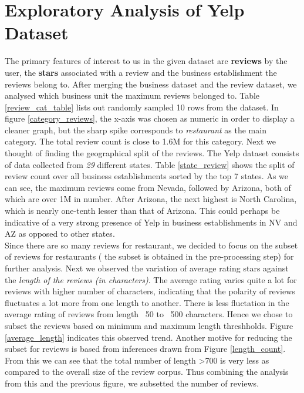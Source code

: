 \documentclass[paper=a4, fontsize=11pt]{scrartcl} %
\numberwithin{equation}{section} %
\numberwithin{figure}{section} %
\numberwithin{table}{section} %
\begin{document}
\section{Exploratory Analysis of Yelp Dataset}
The primary features of interest to us in the given dataset are \textbf{reviews} by the user, the \textbf{stars} associated with a review and the business establishment the reviews belong to. After merging the business dataset and the review dataset, we analysed which business unit the maximum reviews belonged to. Table \ref{review_cat_table} lists out randomly sampled 10 rows from the dataset. In figure \ref{category_reviews}, the x-axis was chosen as numeric in order to display a cleaner graph, but the sharp spike corresponds to \textit{restaurant} as the main category. The total review count is close to 1.6M for this category.
Next we thought of finding the geographical split of the reviews. The Yelp dataset consists of data collected from \textit{29} different states. Table \ref{state_review} shows the split of review count over all business establishments sorted by the top 7 states. 
As we can see, the maximum reviews come from Nevada, followed by Arizona, both of which are over 1M in number. After Arizona, the next highest is North Carolina, which is nearly one-tenth lesser than that of Arizona. This could perhaps be indicative of a very strong presence of Yelp in business establishments in NV and AZ as opposed to other states.\\

Since there are so many reviews for restaurant, we decided to focus on the subset of reviews for restaurants ( the subset is obtained in the pre-processing step) for further analysis.  
Next we observed the variation of average rating stars against the \textit{length of the reviews (in characters)}. The average rating varies quite a lot for reviews with higher number of characters, indicating that the polarity of reviews fluctuates a lot more from one length to another. There is less fluctation in the average rating of reviews from length ~50 to ~500 characters. Hence we chose to subset the reviews based on minimum and maximum length threshholds. Figure \ref{average_length} indicates this observed trend. Another motive for reducing the subset for reviews is based from inferences drawn from Figure \ref{length_count}. From this we can see that the total number of length >700 is very less as compared to the overall size of the review corpus. Thus combining the analysis from this and the previous figure, we subsetted the number of reviews.\\
\end{document}
